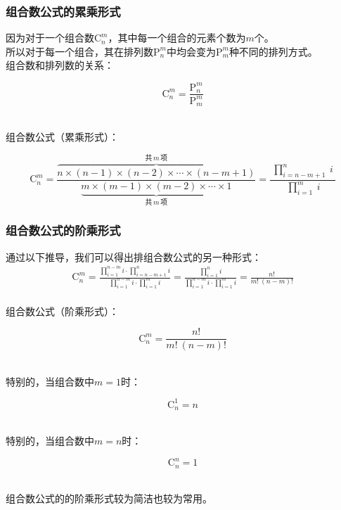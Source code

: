 \documentclass[UTF8]{ctexart}
\newcommand{\Pe}{\mathrm{P}}
\newcommand{\Co}{\mathrm{C}}
\begin{document}
\subsubsection{组合数公式的累乘形式}
    因为对于一个组合数$\Co_n^m$，其中每一个组合的元素个数为$m$个。\\[3mm]
    所以对于每一个组合，其在排列数$\Pe_n^m$中均会变为$\Pe_m^m$种不同的排列方式。\\[4mm]
    组合数和排列数的关系：
    \begin{large}
        \begin{equation*}
            \Co_n^m=\frac{\Pe_n^m}{\Pe_m^m}
        \end{equation*}        
    \end{large}\\
    组合数公式（累乘形式）：
    \begin{large}
        \begin{equation*}
            \Co_n^m=\frac{\overbrace{n\times(n-1)\times(n-2)\times\cdots\times(n-m+1)}^{\text{共}\,m\,\text{项}}}{\underbrace{m\times(m-1)\times(m-2)\times\cdots\times 1}_{\text{共}\,m\,\text{项}}}=\frac{~\prod_{i=n-m+1}^{n}~i~}{\,\prod_{i=1}^{m}~i}
        \end{equation*}
    \end{large}\vspace{-5pt}

\subsubsection{组合数公式的阶乘形式}
    通过以下推导，我们可以得出排组合数公式的另一种形式：\vspace{5pt}
    \setcounter{equation}{0}
    \begin{align}
        \Co_n^m
        =\frac{\prod_{i=1}^{n-m}i\cdot\prod_{i=n-m+1}^ni}{\prod_{i=1}^{n-m}i\cdot\prod_{i=1}^{m}i}
        =\frac{\prod_{i=1}^{n}i}{\prod_{i=1}^{n-m}i\cdot\prod_{i=1}^{m}i}
        =\frac{n!}{m!~(n-m)!}
    \end{align}\\
    组合数公式（阶乘形式）：
    \begin{large}
        \begin{equation*}
            \Co_n^m=\frac{n!}{m!~(n-m)!}
        \end{equation*}
    \end{large}\\
    特别的，当组合数中$m=1$时：
    \begin{large}
        \begin{equation*}
            \Co_n^1=n
        \end{equation*}
    \end{large}\\
    特别的，当组合数中$m=n$时：
    \begin{large}
        \begin{equation*}
            \Co_n^n=1
        \end{equation*}
    \end{large}\\
    组合数公式的的阶乘形式较为简洁也较为常用。
\end{document}
